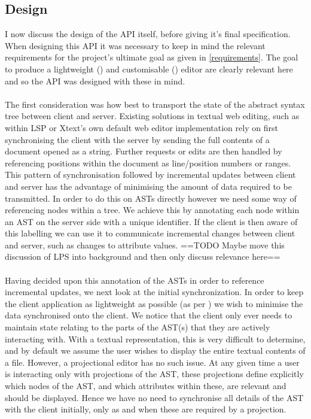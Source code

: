 \documentclass{report}
\begin{document}
\subsection{Design}\label{api}
I now discuss the design of the API itself, before giving it's final specification. When designing this API it was necessary to keep in mind the relevant requirements for the project's ultimate goal as given in \ref{requirements}. The goal to produce a lightweight (\RLightweight) and customisable (\RCustom) editor are clearly relevant here and so the API was designed with these in mind.
\\
\\
The first consideration was how best to transport the state of the abstract syntax tree between client and server. Existing solutions in textual web editing, such as within LSP or Xtext's own default web editor implementation rely on first synchronising the client with the server by sending the full contents of a document opened as a string. Further requests or edits are then handled by referencing positions within the document as line/position numbers or ranges. This pattern of synchronisation followed by incremental updates between client and server has the advantage of minimising the amount of data required to be transmitted. In order to do this on ASTs directly however we need some way of referencing nodes within a tree. We achieve this by annotating each node within an AST on the server side with a unique identifier. If the client is then aware of this labelling we can use it to communicate incremental changes between client and server, such as changes to attribute values.
==TODO Maybe move this discussion of LPS into background and then only discuss relevance here==
\\
\\
Having decided upon this annotation of the ASTs in order to reference incremental updates, we next look at the initial synchronization. In order to keep the client application as lightweight as possible (as per \RLightweight) we wish to minimise the data synchronised onto the client. We notice that the client only ever needs to maintain state relating to the parts of the AST(s) that they are actively interacting with. With a textual representation, this is very difficult to determine, and by default we assume the user wishes to display the entire textual contents of a file. However, a projectional editor has no such issue. At any given time a user is interacting only with projections of the AST, these projections define explicitly which nodes of the AST, and which attributes within these, are relevant and should be displayed. Hence we have no need to synchronise all details of the AST with the client initially, only as and when these are required by a projection.
\end{document}

